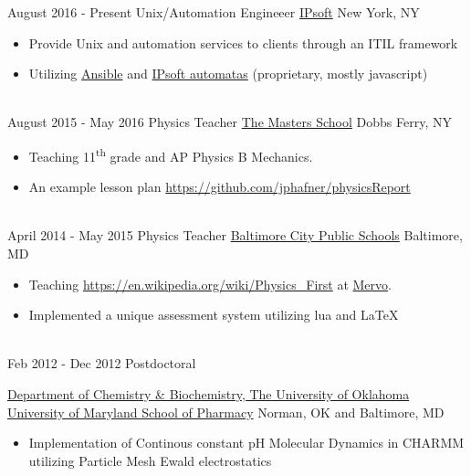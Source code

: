 \documentclass[letterpaper]{twentysecondcv} %
\begin{document}
\begin{twenty} %
\twentyitem
    	{August 2016 -}
		{Present}
        {Unix/Automation Engineeer}
        {\href{http://www.ipsoft.com/}{IPsoft}}
        {New York, NY}
        {\begin{itemize}
        \item Provide Unix and automation services to clients through an ITIL framework
        \item Utilizing \href{https://ansible.com}{Ansible} and \href{https://www.ipsoft.com/ipcenter/}{IPsoft automatas} (proprietary, mostly javascript) %
        \end{itemize}}
        \\
	\twentyitem
    	{August 2015 -}
		{May 2016}
        {Physics Teacher}
        {\href{http://www.mastersny.org/}{The Masters School}}
        {Dobbs Ferry, NY}
        {
        {\begin{itemize}
        \item Teaching 11\textsuperscript{th} grade and AP Physics B Mechanics.
        \item An example lesson plan \href{physicsReport}{https://github.com/jphafner/physicsReport}
    	\end{itemize}}
        }
    \\   
    \twentyitem
   		{April 2014 -}
		{May 2015}
        {Physics Teacher}
        {\href{http://www.baltimorecityschools.org}{Baltimore City Public Schools}}
        {Baltimore, MD}
        {
        {\begin{itemize}
        \item Teaching \href{physics first}{https://en.wikipedia.org/wiki/Physics_First} at \href{https://mervo.org}{Mervo}.
        \item Implemented a unique assessment system utilizing lua and \LaTeX
    \end{itemize}}
        }
     \\
     \twentyitem
   		{Feb 2012 -}
		{Dec 2012}
        {Postdoctoral}
        {\href{http://www.ou.edu/cas/chemistry/}{Department of Chemistry \& Biochemistry, The University of Oklahoma}
        {\href{http://pharmacy.umaryland.edu}{University of Maryland School of Pharmacy}
        }
        {Norman, OK and Baltimore, MD}
        {
        \begin{itemize}
        \item Implementation of Continous constant pH Molecular Dynamics in CHARMM utilizing Particle Mesh Ewald electrostatics

\end{itemize}}}
\end{twenty}
\end{document}
